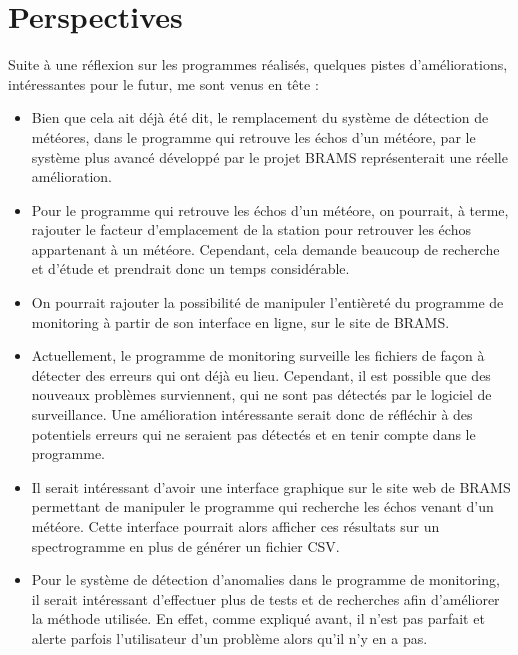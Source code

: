 \documentclass[11pt]{article}
\begin{document}
\newpage

\section{Perspectives}

Suite à une réflexion sur les programmes réalisés, quelques pistes d'améliorations, intéressantes pour le futur, me sont venus en tête :
\begin{itemize}
    \item Bien que cela ait déjà été dit, le remplacement du système de détection de météores, dans le programme qui retrouve les échos d'un météore, par le système plus avancé développé par le projet BRAMS représenterait une réelle amélioration.
    \item Pour le programme qui retrouve les échos d'un météore, on pourrait, à terme, rajouter le facteur d'emplacement de la station pour retrouver les échos appartenant à un météore.
          Cependant, cela demande beaucoup de recherche et d'étude et prendrait donc un temps considérable.
    \item On pourrait rajouter la possibilité de manipuler l'entièreté du programme de monitoring à partir de son interface en ligne, sur le site de BRAMS.
    \item Actuellement, le programme de monitoring surveille les fichiers de façon à détecter des erreurs qui ont déjà eu lieu.
          Cependant, il est possible que des nouveaux problèmes surviennent, qui ne sont pas détectés par le logiciel de surveillance.
          Une amélioration intéressante serait donc de réfléchir à des potentiels erreurs qui ne seraient pas détectés et en tenir compte dans le programme.
    \item Il serait intéressant d'avoir une interface graphique sur le site web de BRAMS permettant de manipuler le programme qui recherche les échos venant d'un météore.
          Cette interface pourrait alors afficher ces résultats sur un spectrogramme en plus de générer un fichier CSV.
    \item Pour le système de détection d'anomalies dans le programme de monitoring, il serait intéressant d'effectuer plus de tests et de recherches afin d'améliorer la méthode utilisée.
          En effet, comme expliqué avant, il n'est pas parfait et alerte parfois l'utilisateur d'un problème alors qu'il n'y en a pas.
\end{itemize}


\end{document}
